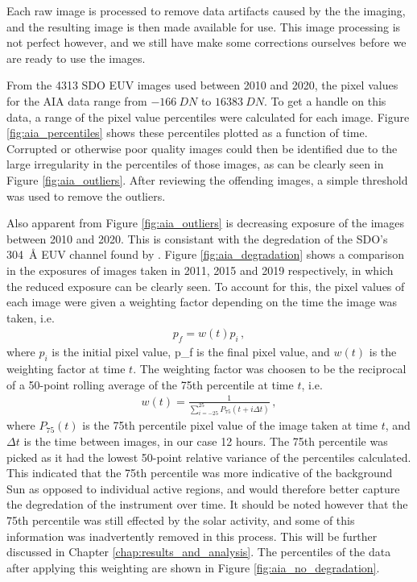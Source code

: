 \documentclass[11pt,a4paper,onecolumn]{report}
\begin{document}
Each raw image is processed to remove data artifacts caused by the the imaging,
and the resulting image is then made available for use. This image processing is
not perfect however, and we still have make some corrections ourselves before we
are ready to use the images.

From the 4313 SDO EUV images used between 2010 and 2020, the pixel values for the
AIA data range from \(\SI[]{-166}[]{DN}\) to \(\SI[]{16383}[]{DN}\). To get a
handle on this data, a range of the pixel value percentiles were calculated for
each image. Figure \ref{fig:aia_percentiles} shows these percentiles plotted as
a function of time. Corrupted or otherwise poor quality images could then be
identified due to the large irregularity in the percentiles of those images, as
can be clearly seen in Figure \ref{fig:aia_outliers}. After reviewing the
offending images, a simple threshold was used to remove the outliers.

Also apparent from Figure \ref{fig:aia_outliers} is decreasing exposure of the
images between 2010 and 2020. This is consistant with the degredation of the
SDO's \SI{304}{\angstrom} EUV channel found by \citet{boerner_photometric_2014}.
Figure \ref{fig:aia_degradation} shows a comparison in the exposures of
images taken in 2011, 2015 and 2019 respectively, in which the reduced exposure
can be clearly seen. To account for this, the pixel
values of each image were given a weighting factor depending on the time the
image was taken, i.e.
\begin{align}
  p_f = w(t) p_i \, ,
\end{align}
where $p_i$ is the initial pixel value, p_f is the final pixel value, and $w(t)$
is the weighting factor at time $t$. The weighting factor was choosen to be the 
reciprocal of a 50-point rolling average of the 75th
percentile at time $t$, i.e.
\begin{align}
  w(t) = \frac{1}{\sum\limits_{i=-25}^{25}P_{75}(t + i \Delta t)} \, ,
\end{align}
where $P_{75}(t)$ is the 75th percentile pixel value of the image taken at time
$t$, and $\Delta t$ is the time between images, in our case 12 hours. The 75th
percentile was picked as it had the lowest 50-point relative variance of the
percentiles calculated. This indicated that the 75th percentile was more
indicative of the background Sun as opposed to individual active regions, and
would therefore better capture the degredation of the instrument over time. It
should be noted however that the 75th percentile was still effected by the solar
activity, and some of this information was inadvertently removed in this
process. This will be further discussed in Chapter
\ref{chap:results_and_analysis}. The percentiles of the data after applying this
weighting are shown in Figure \ref{fig:aia_no_degradation}. \\
\end{document}
